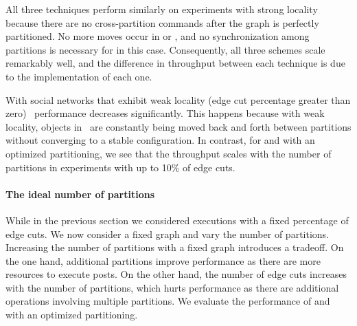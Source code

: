 All three techniques perform similarly on experiments with
strong locality because there are no cross-partition commands after
the graph is perfectly partitioned. No more moves occur in
\dynastar or \dssmr, and no synchronization among partitions is
necessary for \ssmr in this case. 
Consequently, all three schemes scale remarkably well, and
the difference in throughput between each technique is due to the implementation of each one.

With social networks that exhibit weak locality (edge cut percentage greater than zero) \dssmr\ performance decreases significantly.  
This happens because with weak locality, objects in \dssmr\ are constantly being moved back and forth between partitions 
without converging to a stable configuration.
In contrast, for \dynastar and \ssmr with an optimized partitioning, we see that the throughput scales with the number of partitions in experiments with up to 10\% of edge cuts. 



\paragraph*{The ideal number of partitions}
\label{sec:evaluation:results}

While in the previous section we considered executions with a fixed percentage of edge cuts.
We now consider a fixed graph and vary the number of partitions.
Increasing the number of partitions with a fixed graph introduces a tradeoff.
On the one hand, additional partitions improve performance as there are more resources to execute posts.
On the other hand, the number of edge cuts increases with the number of partitions, which hurts performance as there are additional operations involving multiple partitions.
We evaluate the performance of \dynastar and \ssmr with an optimized partitioning.%

